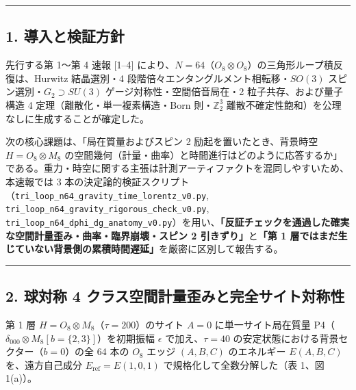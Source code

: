 \documentclass[
  a4paper,
]{ltjsarticle}
\begin{document}
\begin{center}\rule{0.5\linewidth}{0.5pt}\end{center}

\subsection{1.
導入と検証方針}\label{ux5c0eux5165ux3068ux691cux8a3cux65b9ux91dd}

先行する第 1〜第 4 速報 {[}1--4{]}
により、\(N = 64\)（\(O_8 \otimes O_8\)）の三角形ループ積反復は、Hurwitz
結晶選別・4 段階倍々エンタングルメント相転移・\(SO(3)\)
スピン選別・\(G_2 \supset SU(3)\) ゲージ対称性・空間倍音局在・2
粒子共存、および量子構造 4 定理（離散化・単一複素構造・Born
則・\(\mathbb{Z}_2^3\)
離散不確定性飽和）を公理なしに生成することが確定した。

次の核心課題は、「局在質量およびスピン 2 励起を置いたとき、背景時空
\(H = O_8 \otimes M_8\)
の空間幾何（計量・曲率）と時間進行はどのように応答するか」である。重力・時空に関する主張は計測アーティファクトを混同しやすいため、本速報では
3
本の決定論的検証スクリプト（\texttt{tri\_loop\_n64\_gravity\_time\_lorentz\_v0.py},
\texttt{tri\_loop\_n64\_gravity\_rigorous\_check\_v0.py},
\texttt{tri\_loop\_n64\_dphi\_dg\_anatomy\_v0.py}）を用い、\textbf{「反証チェックを通過した確実な空間計量歪み・曲率・臨界崩壊・スピン
2 引きずり」}と\textbf{「第 1
層ではまだ生じていない背景側の累積時間遅延」}を厳密に区別して報告する。

\begin{center}\rule{0.5\linewidth}{0.5pt}\end{center}

\subsection{2. 球対称 4
クラス空間計量歪みと完全サイト対称性}\label{ux7403ux5bfeux79f0-4-ux30afux30e9ux30b9ux7a7aux9593ux8a08ux91cfux6b6aux307fux3068ux5b8cux5168ux30b5ux30a4ux30c8ux5bfeux79f0ux6027}

第 1 層 \(H = O_8 \otimes M_8\)（\(\tau = 200\)）のサイト \(A = 0\)
に単一サイト局在質量
P4（\(\delta_{000} \otimes M_8[b=\{2,3\}]\)）を初期振幅 \(\epsilon\)
で加え、\(\tau = 40\) の安定状態における背景セクター（\(b = 0\)）の全 64
本の \(O_8\) エッジ \((A, B, C)\) のエネルギー \(E(A, B, C)\)
を、遠方自己成分 \(E_{\mathrm{ref}} = E(1, 0, 1)\)
で規格化して全数分解した（表 1、図 1(a)）。
\end{document}
